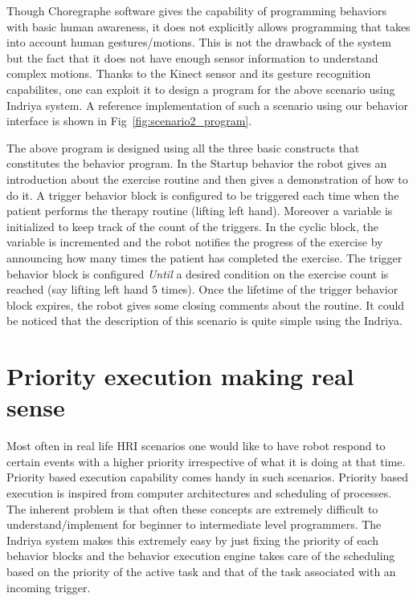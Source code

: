 Though Choregraphe software gives the capability of programming behaviors with basic human awareness, it does not explicitly allows programming that takes into account human gestures/motions. This is not the drawback of the system but the fact that it does not have enough sensor information to understand complex motions. Thanks to the Kinect sensor and its gesture recognition capabilites, one can exploit it to design a program for the above scenario using Indriya system. A reference implementation of such a scenario using our behavior interface is shown in Fig~\ref{fig:scenario2_program}.

The above program is designed using all the three basic constructs that constitutes the behavior program. In the Startup behavior the robot gives an introduction about the exercise routine and then gives a demonstration of how to do it. A trigger behavior block is configured to be triggered each time when the patient performs the therapy routine (lifting left hand). Moreover a variable is initialized to keep track of the count of the triggers. In the cyclic block, the variable is incremented and the robot notifies the progress of the exercise by announcing how many times the patient has completed the exercise. The trigger behavior block is configured \emph{Until} a desired condition on the exercise count is reached (say lifting left hand 5 times). Once the lifetime of the trigger behavior block expires, the robot gives some closing comments about the routine. It could be noticed that the description of this scenario is quite simple using the Indriya. 

\section{Priority execution making real sense}
Most often in real life HRI scenarios one would like to have robot respond to certain events with a higher priority irrespective of what it is doing at that time. Priority based execution capability comes handy in such scenarios. Priority based execution is inspired from computer architectures and scheduling of processes. The inherent problem is that often these concepts are extremely difficult to understand/implement for beginner to intermediate level programmers. The Indriya system makes this extremely easy by just fixing the priority of each behavior blocks and the behavior execution engine takes care of the scheduling based on the priority of the active task and that of the task associated with an incoming trigger. %

